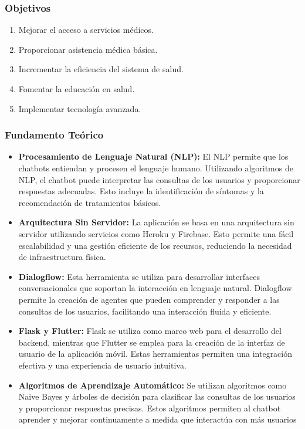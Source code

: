 	\subsubsection{Objetivos}
		\begin{enumerate}
			\item Mejorar el acceso a servicios médicos.
			
			\item Proporcionar asistencia médica básica.
			
			\item Incrementar la eficiencia del sistema de salud.
			
			\item Fomentar la educación en salud.
			
			\item Implementar tecnología avanzada.
		\end{enumerate}

	\subsubsection{Fundamento Teórico}
	
		\begin{itemize}
		\item \textbf{Procesamiento de Lenguaje Natural (NLP):} El NLP permite que los chatbots entiendan y procesen el lenguaje humano. Utilizando algoritmos de NLP, el chatbot puede interpretar las consultas de los usuarios y proporcionar respuestas adecuadas. Esto incluye la identificación de síntomas y la recomendación de tratamientos básicos.
	
		\item \textbf{Arquitectura Sin Servidor:} La aplicación se basa en una arquitectura sin servidor utilizando servicios como Heroku y Firebase. Esto permite una fácil escalabilidad y una gestión eficiente de los recursos, reduciendo la necesidad de infraestructura física.
	
		\item \textbf{Dialogflow:} Esta herramienta se utiliza para desarrollar interfaces conversacionales que soportan la interacción en lenguaje natural. Dialogflow permite la creación de agentes que pueden comprender y responder a las consultas de los usuarios, facilitando una interacción fluida y eficiente.
	
		\item \textbf{Flask y Flutter:} Flask se utiliza como marco web para el desarrollo del backend, mientras que Flutter se emplea para la creación de la interfaz de usuario de la aplicación móvil. Estas herramientas permiten una integración efectiva y una experiencia de usuario intuitiva.
	
		\item \textbf{Algoritmos de Aprendizaje Automático:} Se utilizan algoritmos como Naive Bayes y árboles de decisión para clasificar las consultas de los usuarios y proporcionar respuestas precisas. Estos algoritmos permiten al chatbot aprender y mejorar continuamente a medida que interactúa con más usuarios
		\end{itemize}

